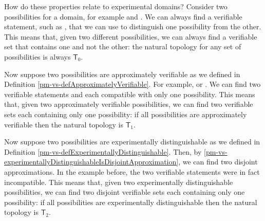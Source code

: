 	How do these properties relate to experimental domains? Consider two possibilities for a domain, for example  and . We can always find a verifiable statement, such as , that we can use to distinguish one possibility from the other. This means that, given two different possibilities, we can always find a verifiable set that contains one and not the other: the natural topology for any set of possibilities is always $\mathsf{T}_0$.
	
	Now suppose two possibilities are approximately verifiable as we defined in Definition \ref{pm-vs-defApproximatelyVerifiable}. For example,  or . We can find two verifiable statements  and  each compatible with only one possibility. This means that, given two approximately verifiable possibilities, we can find two verifiable sets each containing only one possibility: if all possibilities are approximately verifiable then the natural topology is $\mathsf{T}_1$.
	
	Now suppose two possibilities are experimentally distinguishable as we defined in Definition \ref{pm-vs-defExperimentallyDistinguishable}. Then, by \ref{pm-vs-experimentallyDistinguishableIsDisjointApproximation}, we can find two disjoint approximations. In the example before, the two verifiable statements were in fact incompatible. This means that, given two experimentally distinguishable possibilities, we can find two disjoint verifiable sets each containing only one possibility: if all possibilities are experimentally distinguishable then the natural topology is $\mathsf{T}_2$.
	
